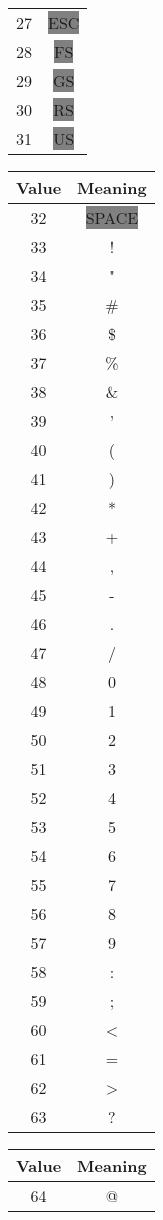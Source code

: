 \documentclass[12pt]{book}
\begin{document}
{\begin{tabular}{c c}
     27 & \colorbox{gray}{ESC} \\
     28 & \colorbox{gray}{FS} \\
     29 & \colorbox{gray}{GS} \\
     30 & \colorbox{gray}{RS} \\
     31 & \colorbox{gray}{US} \\
  \end{tabular}
  \quad
  \begin{tabular}{c c}
    \hline
    Value & Meaning \\
    \hline
     32 & \colorbox{gray}{SPACE} \\
     33 & ! \\
     34 & " \\
     35 & \# \\
     36 & \$ \\
     37 & \% \\
     38 & \& \\
     39 & ' \\
     40 & ( \\
     41 & ) \\
     42 & * \\
     43 & + \\
     44 & , \\
     45 & - \\
     46 & . \\
     47 & / \\
     48 & 0 \\
     49 & 1 \\
     50 & 2 \\
     51 & 3 \\
     52 & 4 \\
     53 & 5 \\
     54 & 6 \\
     55 & 7 \\
     56 & 8 \\
     57 & 9 \\
     58 & : \\
     59 & ; \\
     60 & < \\
     61 & = \\
     62 & > \\
     63 & ? \\
  \end{tabular}
  \quad
  \begin{tabular}{c c}
    \hline
    Value & Meaning \\
    \hline
     64 & @ \\

\end{tabular}}
\end{document}
